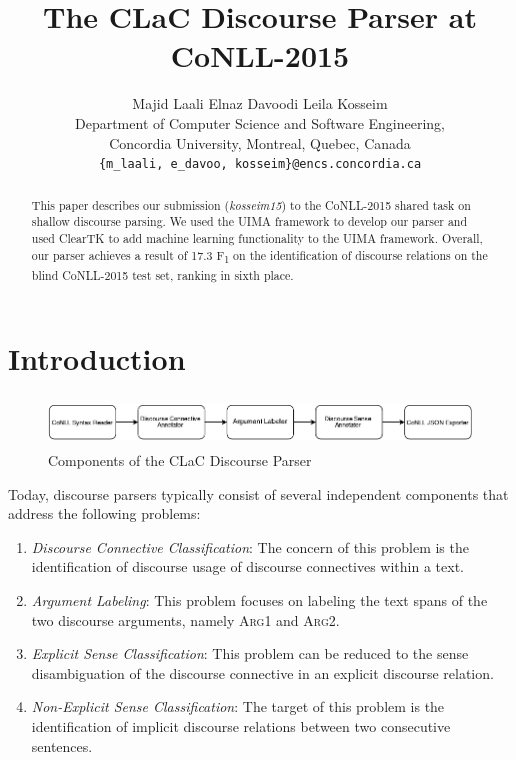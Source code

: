 \documentclass[11pt]{article}
\title{The CLaC Discourse Parser at CoNLL-2015}
\author{Majid Laali \hspace{2cm} Elnaz Davoodi \hspace{2cm} Leila Kosseim \\
  Department of Computer Science and Software Engineering, \\
  Concordia University, Montreal, Quebec, Canada \\
  {\tt \{m\_laali, e\_davoo, kosseim\}@encs.concordia.ca} \\
  }
\date{}
\begin{document}
\maketitle
\begin{abstract}
   This paper describes our submission (\textit{kosseim15}) to the CoNLL-2015 shared task on shallow discourse parsing. We used the UIMA framework to develop our parser and used ClearTK to add machine learning functionality to the UIMA framework. 
   Overall, our parser achieves a result of 17.3 F\textsubscript{1} on the identification of discourse relations on the blind CoNLL-2015 test set, ranking in sixth place. 
\end{abstract}

\section{Introduction}
\begin{figure}[ht]
\centering
\includegraphics[height=13mm]{CLaCDiscourseParser-crop}
\caption{Components of the CLaC Discourse Parser}
\label{fig:architecture}
\end{figure}




Today, discourse parsers typically consist of several independent components that address the following problems:
\begin{enumerate}
\item \textit{Discourse Connective Classification}: The concern of this problem is the identification of discourse usage of discourse connectives within a text. 
\item \textit{Argument Labeling}: This problem focuses on labeling the text spans of the two discourse arguments, namely \textsc{Arg1} and \textsc{Arg2}.
\item \textit{Explicit Sense Classification}: This problem can be reduced to the sense disambiguation of the discourse connective in an explicit discourse relation.
\item \textit{Non-Explicit Sense Classification}: The target of this problem is the identification of implicit discourse relations between two consecutive sentences.
\end{enumerate}
\end{document}
